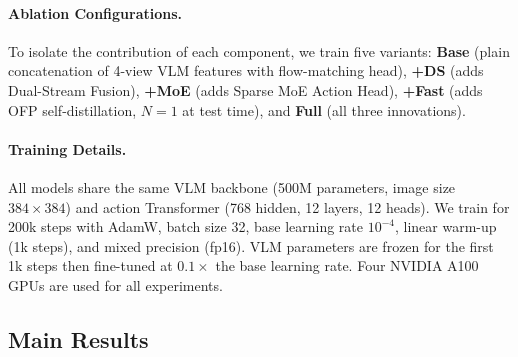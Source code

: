 \documentclass[10pt,twocolumn]{article}
\begin{document}
\paragraph{Ablation Configurations.}
To isolate the contribution of each component, we train five variants:
\textbf{Base} (plain concatenation of 4-view VLM features with flow-matching
head),
\textbf{+DS} (adds Dual-Stream Fusion),
\textbf{+MoE} (adds Sparse MoE Action Head),
\textbf{+Fast} (adds OFP self-distillation, $N{=}1$ at test time), and
\textbf{Full} (all three innovations).

\paragraph{Training Details.}
All models share the same VLM backbone (500M parameters, image size $384{\times}384$)
and action Transformer (768 hidden, 12 layers, 12 heads).
We train for 200k steps with AdamW, batch size 32, base learning rate
$10^{-4}$, linear warm-up (1k steps), and mixed precision (fp16).
VLM parameters are frozen for the first 1k steps then fine-tuned at
$0.1\times$ the base learning rate.
Four NVIDIA A100 GPUs are used for all experiments.



\subsection{Main Results}
\label{sec:exp:main}
\end{document}
